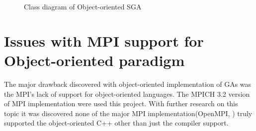 \begin{figure}[!hp]
    \vspace*{-1.5cm}
    \caption{Class diagram of Object-oriented SGA}
     \label{fig:sga_classdiagram}
\end{figure}

\section{Issues with MPI support for Object-oriented paradigm}
The major drawback discovered with object-oriented implementation of GAs was the MPI's lack of support for object-oriented languages. The MPICH 3.2 version of MPI implementation were used this project. With further research on this topic it was discovered none of the major MPI implementation(OpenMPI, ) truly supported the object-oriented C++ other than just the compiler support.

